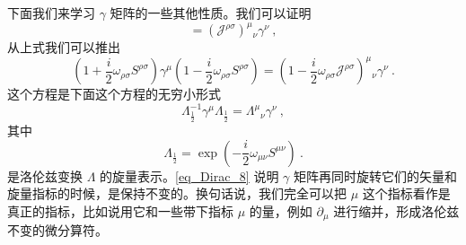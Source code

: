下面我们来学习 $\gamma$ 矩阵的一些其他性质。我们可以证明
\begin{equation}
[\gamma^\mu,S^{\rho\sigma}] = (\mathcal J^{\rho\sigma})^\mu{}_\nu \gamma^\nu ~,
\end{equation}
从上式我们可以推出
\begin{equation}
(1+\frac{i}{2}\omega_{\rho\sigma}S^{\rho\sigma})\gamma^\mu (1-\frac{i}{2}\omega_{\rho\sigma}S^{\rho\sigma}) = (1-\frac{i}{2}\omega_{\rho\sigma}\mathcal J^{\rho\sigma})^\mu{}_\nu \gamma^\nu~.
\end{equation}
这个方程是下面这个方程的无穷小形式
\begin{equation}\label{eq_Dirac_8}
\Lambda^{-1}_{\frac{1}{2}}\gamma^\mu\Lambda_{\frac{1}{2}}= \Lambda^\mu{}_\nu\gamma^\nu~,
\end{equation}
其中
\begin{equation}
\Lambda_{\frac{1}{2}} = \exp (-\frac{i}{2}\omega_{\mu\nu}S^{\mu\nu})~. 
\end{equation}
是洛伦兹变换 $\Lambda$ 的旋量表示。\autoref{eq_Dirac_8} 说明 $\gamma$ 矩阵再同时旋转它们的矢量和旋量指标的时候，是保持不变的。换句话说，我们完全可以把 $\mu$ 这个指标看作是真正的指标，比如说用它和一些带下指标 $\mu$ 的量，例如 $\partial_\mu$ 进行缩并，形成洛伦兹不变的微分算符。

